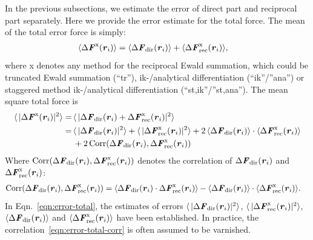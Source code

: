 \documentclass[aps,pre,preprint,unsortedaddress]{revtex4}
\renewcommand{\v}[1]{\textbf{\textit{#1}}}
\begin{document}
In the previous subsections, we estimate the error of direct part and
reciprocal part separately. Here we provide the error estimate for the
total force. The mean of the total error force is simply:
\begin{align}
  \langle\Delta\v F^{\textrm{x}}(\v r_i) \rangle
  &=
  \langle\Delta\v F_{\textrm{dir}}(\v r_i) \rangle +
  \langle\Delta\v F^{\textrm{x}}_{\textrm{rec}}(\v r_i) \rangle,
\end{align}
where \textrm{x}
denotes any method for the reciprocal Ewald summation, which
could be truncated Ewald summation (``tr''), ik-/analytical differentiation
(``ik''/''ana'') or staggered method
ik-/analytical differentiation (``st,ik''/''st,ana'').
The mean square total force is
\begin{align}\nonumber
  \langle\,\vert\Delta\v F^{\textrm{x}}(\v r_i)\vert^2\rangle
  = \,&
  \langle\,\vert
  \Delta\v F_{\textrm{dir}}(\v r_i) + \Delta\v F^{\textrm{x}}_{\textrm{rec}}(\v r_i) 
  \vert^2 \rangle \\\nonumber
  = \,&
  \langle\,\vert\Delta\v F_{\textrm{dir}}(\v r_i)\vert^2\rangle +
  \langle\,\vert\Delta\v F^{\textrm{x}}_{\textrm{rec}}(\v r_i)\vert^2\rangle +
  2\,\langle\Delta\v F_{\textrm{dir}}(\v r_i)\rangle
  \cdot \langle\Delta\v F^{\textrm{x}}_{\textrm{rec}}(\v r_i)\rangle \\
  \label{eqn:error-total}
  &
  + 2\,\textrm{Corr}(\Delta\v F_{\textrm{dir}}(\v r_i),
  \Delta\v F^{\textrm{x}}_{\textrm{rec}}(\v r_i))
\end{align}
Where $ \textrm{Corr}(\Delta\v F_{\textrm{dir}}(\v r_i), \Delta\v
F^{\textrm{x}}_{\textrm{rec}}(\v r_i))$ denotes the correlation of
$\Delta\v F_{\textrm{dir}}(\v r_i)$ and $\Delta\v
F^{\textrm{x}}_{\textrm{rec}}(\v r_i)$:
\begin{align}\label{eqn:error-total-corr}
  \textrm{Corr}(\Delta\v F_{\textrm{dir}}(\v r_i),
  \Delta\v F^{\textrm{x}}_{\textrm{rec}}(\v r_i))
  & =
  \langle
  \Delta\v F_{\textrm{dir}}(\v r_i)\cdot
  \Delta\v F^{\textrm{x}}_{\textrm{rec}}(\v r_i)
  \rangle -
  \langle
  \Delta\v F_{\textrm{dir}}(\v r_i)
  \rangle\cdot
  \langle
  \Delta\v F^{\textrm{x}}_{\textrm{rec}}(\v r_i)
  \rangle.
\end{align}
In Eqn.~\eqref{eqn:error-total}, the estimates of errors
$\langle\,\vert\Delta\v F_{\textrm{dir}}(\v r_i)\vert^2\rangle $,
$\langle\,\vert\Delta\v F^{\textrm{x}}_{\textrm{rec}}(\v
r_i)\vert^2\rangle $, $\langle\Delta\v F_{\textrm{dir}}(\v
r_i)\rangle$ and $\langle\Delta\v F^{\textrm{x}}_{\textrm{rec}}(\v
r_i)\rangle $ have been established.
In practice, the correlation~\eqref{eqn:error-total-corr}
is often assumed to be varnished.
\end{document}
